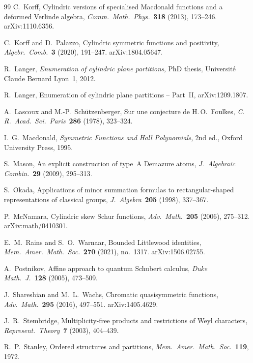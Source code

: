 \documentclass[11pt]{article}
\theoremstyle{plain}
\theoremstyle{definition}
\theoremstyle{remark}
\begin{document}
\begin{thebibliography}{99}
C.~Korff,
Cylindric versions of specialised Macdonald functions and a
deformed Verlinde algebra,
\emph{Comm.\ Math.\ Phys.}\ \textbf{318} (2013), 173--246.
arXiv:1110.6356.

C.~Korff and D.~Palazzo,
Cylindric symmetric functions and positivity,
\emph{Algebr.\ Comb.}\ \textbf{3} (2020), 191--247.
arXiv:1804.05647.

R.~Langer,
\emph{Enumeration of cylindric plane partitions},
PhD thesis, Universit\'e Claude Bernard Lyon~1, 2012.

R.~Langer,
Enumeration of cylindric plane partitions -- Part~II,
arXiv:1209.1807.

A.~Lascoux and M.-P.~Sch\"utzenberger,
Sur une conjecture de H.\,O.~Foulkes,
\emph{C.\,R.\ Acad.\ Sci.\ Paris}\ \textbf{286} (1978), 323--324.

I.~G.~Macdonald,
\emph{Symmetric Functions and Hall Polynomials},
2nd ed., Oxford University Press, 1995.

S.~Mason,
An explicit construction of type~A Demazure atoms,
\emph{J.~Algebraic Combin.}\ \textbf{29} (2009), 295--313.

S.~Okada,
Applications of minor summation formulas to rectangular-shaped
representations of classical groups,
\emph{J.~Algebra}\ \textbf{205} (1998), 337--367.

P.~McNamara,
Cylindric skew Schur functions,
\emph{Adv.\ Math.}\ \textbf{205} (2006), 275--312.
arXiv:math/0410301.

E.~M.~Rains and S.~O.~Warnaar,
Bounded Littlewood identities,
\emph{Mem.\ Amer.\ Math.\ Soc.}\ \textbf{270} (2021), no.~1317.
arXiv:1506.02755.

A.~Postnikov,
Affine approach to quantum Schubert calculus,
\emph{Duke Math.\ J.}\ \textbf{128} (2005), 473--509.

J.~Shareshian and M.~L.~Wachs,
Chromatic quasisymmetric functions,
\emph{Adv.\ Math.}\ \textbf{295} (2016), 497--551.
arXiv:1405.4629.

J.~R.~Stembridge,
Multiplicity-free products and restrictions of Weyl characters,
\emph{Represent.\ Theory}\ \textbf{7} (2003), 404--439.

R.~P.~Stanley,
Ordered structures and partitions,
\emph{Mem.\ Amer.\ Math.\ Soc.}\ \textbf{119}, 1972.


\end{thebibliography}
\end{document}
